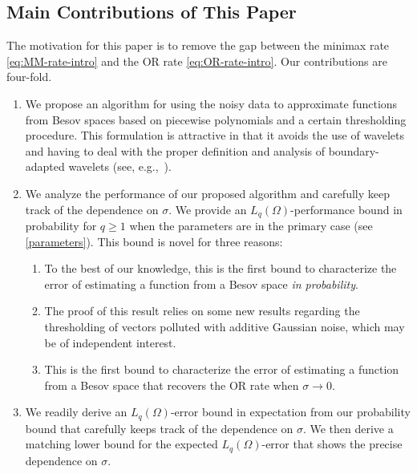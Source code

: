 \subsection{Main Contributions of This Paper}
The motivation for this paper is to remove the gap between the minimax rate \eqref{eq:MM-rate-intro} and the OR rate \eqref{eq:OR-rate-intro}.   Our contributions are four-fold.
\begin{enumerate}
    \item We propose an algorithm for using the noisy data   to approximate functions from  Besov spaces based on piecewise polynomials and a certain thresholding procedure. This formulation is attractive in that it avoids the use of wavelets and having to deal with the proper definition and analysis of boundary-adapted wavelets (see, e.g.,~\cite{CDD,CDV}).

    \item We analyze the performance of our proposed algorithm and carefully keep track of the dependence on $\sigma$.    We provide an   $L_q(\Omega)$-performance bound in probability for  $q\geq 1$ when the parameters are in the primary case (see \eqref{parameters}). This bound is novel for three reasons:
    \begin{enumerate}
        \item To the best of our knowledge, this is the first bound to characterize the error of estimating a function from a Besov space \emph{in probability}.
        
        \item The proof of this result relies on some new results regarding the thresholding of vectors polluted with additive Gaussian noise, which may be of independent interest.

        \item This is the first bound to characterize the error of estimating a function from a Besov space that recovers the OR rate when $\sigma \to 0$.
    \end{enumerate}

    \item We readily derive an $L_q(\Omega)$-error bound in expectation from our probability bound that carefully keeps track of the dependence on $\sigma$. We then derive a   matching lower bound for the expected $L_q(\Omega)$-error that shows the precise dependence on $\sigma$. 
    

\end{enumerate}
